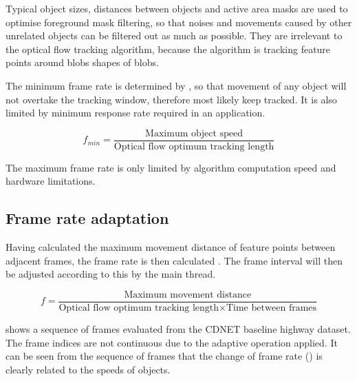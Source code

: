 Typical object sizes, distances between objects and active area masks are used to optimise foreground mask filtering, so that noises and movements caused by other unrelated objects can be filtered out as much as possible. They are irrelevant to the optical flow tracking algorithm, because the algorithm is tracking feature points around blobs  shapes of blobs.

The minimum frame rate is determined by , so that movement of any object will not overtake the tracking window, therefore most likely keep  tracked. It is also limited by minimum response rate required in an application.

\begin{equation}
	f_{min} = \frac{\text{Maximum object speed}}{\text{Optical flow optimum tracking length}}
	\label{f_min}
\end{equation}

The maximum frame rate is only limited by algorithm computation speed and hardware limitations.

\subsection{Frame rate adaptation}

Having calculated the maximum movement distance of feature points between adjacent frames, the frame rate is then calculated  . The frame interval will then be adjusted according to this by the main thread.

\begin{equation}
	f = \frac{\text{Maximum movement distance}}{\text{Optical flow optimum tracking length} \times \text{Time between frames}}
	\label{f_rate}
\end{equation}


 shows a sequence of frames evaluated from the CDNET baseline highway dataset. The frame indices are not continuous due to the adaptive operation applied. It can be seen from the sequence of frames that the change of frame rate () is clearly related to the speeds of objects. 

